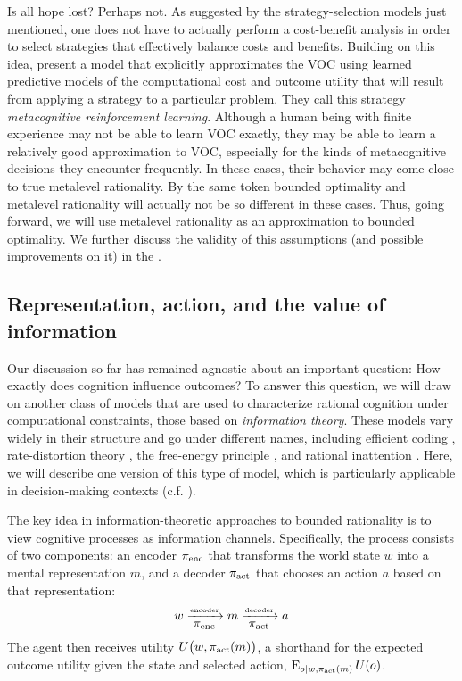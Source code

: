 
Is all hope lost? Perhaps not. As suggested by the strategy-selection models just mentioned, one does not have to actually perform a cost-benefit analysis in order to select strategies that effectively balance costs and benefits. Building on this idea, \citet{lieder2017strategy} present a model that explicitly approximates the VOC using learned predictive models of the computational cost and outcome utility that will result from applying a strategy to a particular problem. They call this strategy \emph{metacognitive reinforcement learning}. Although a human being with finite experience may not be able to learn VOC exactly, they may be able to learn a relatively good approximation to VOC, especially for the kinds of metacognitive decisions they encounter frequently. In these cases, their behavior may come close to true metalevel rationality. By the same token bounded optimality and metalevel rationality will actually not be so different in these cases. Thus, going forward, we will use metalevel rationality as an approximation to bounded optimality. We further discuss the validity of this assumptions (and possible improvements on it) in the .
 
\subsection{Representation, action, and the value of information}\label{sec:intro-info}

Our discussion so far has remained agnostic about an important question: How exactly does cognition influence outcomes? To answer this question, we will draw on another class of models that are used to characterize rational cognition under computational constraints, those based on \emph{information theory}. These models vary widely in their structure and go under different names, including efficient coding \citep{barlow1961possible,stocker2006noise}, rate-distortion theory \citep{sims2016rate}, the free-energy principle \citep{friston2010freeenergy}, and rational inattention \citep{sims2003implications}. Here, we will describe one version of this type of model, which is particularly applicable in decision-making contexts (c.f. \citealp{bhui2021resourcerational}).


The key idea in information-theoretic approaches to bounded rationality is to view cognitive processes as information channels. Specifically, the process consists of two components: an encoder $\pi_{\text{enc}}$ that transforms the world state $w$ into a mental representation $m$, and a decoder $\pi_{\text{act}}$ that chooses an action $a$ based on that representation:
\begin{equation}
  w \xrightarrow[{\displaystyle \pi_{\text{enc}}}]{\text{\tiny encoder}} m 
    \xrightarrow[{\displaystyle \pi_{\text{act}}}]{\text{\tiny decoder}} a
\end{equation}
The agent then receives utility $U \big(w, \pi_{\text{act}}(m) \big)$, a shorthand for the expected outcome utility given the state and selected action, $\operatorname*{E}_{o \mid w, \pi_{\text{act}}(m)} U(o)$.

